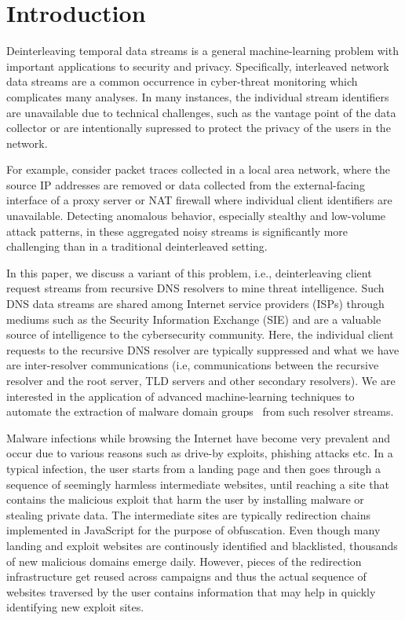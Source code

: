 	\section{Introduction}
	Deinterleaving temporal data streams is a general machine-learning
	problem with important applications to security and privacy.
	Specifically, interleaved network data streams are a common occurrence
	in cyber-threat monitoring which complicates many analyses.  In many
	instances, the individual stream identifiers are unavailable due
	to technical challenges, such as the vantage point of the data
	collector or are intentionally supressed to protect the privacy
	of the users in the network.
	
	For example, consider packet traces collected in a local area network,
	where the source IP addresses are removed or data collected from the
	external-facing interface of a proxy server or NAT firewall
	where individual client identifiers are unavailable.  Detecting anomalous
	behavior, especially stealthy and low-volume attack patterns, in
	these aggregated noisy streams is significantly more challenging than
	in a traditional deinterleaved setting.
	
	In this paper, we discuss a variant of this problem, i.e.,
	deinterleaving client request streams from recursive DNS resolvers
	to mine threat intelligence.  Such DNS data streams are shared
	among Internet service providers (ISPs) through mediums such
	as the Security Information Exchange (SIE) and are a valuable
	source of intelligence to the cybersecurity community.  Here, the individual
	client requests to the recursive DNS resolver are typically suppressed and
	what we have are inter-resolver communications (i.e, communications
	between the recursive resolver and the root server, TLD servers
	and other secondary resolvers).  We are interested in
	the application of advanced machine-learning techniques to automate
	the extraction of malware domain groups~\cite{} from such resolver streams.
	
	Malware infections while browsing the Internet have become very
	prevalent and occur due to various reasons such as drive-by exploits,
	phishing attacks etc.  In a typical infection, the user starts from
	a landing page and then goes through a sequence of seemingly harmless
	intermediate websites, until reaching a site that contains the malicious
	exploit that harm the user by installing malware or stealing private
	data.  The intermediate sites are typically redirection chains implemented
	in JavaScript for the purpose of obfuscation.
	Even though many landing and exploit websites are continously identified and
	blacklisted, thousands of new malicious domains emerge daily.  However,
	pieces of the redirection infrastructure get reused across campaigns
	and thus the actual sequence of websites traversed by the user contains
	information that may help in quickly identifying new exploit sites.
	
